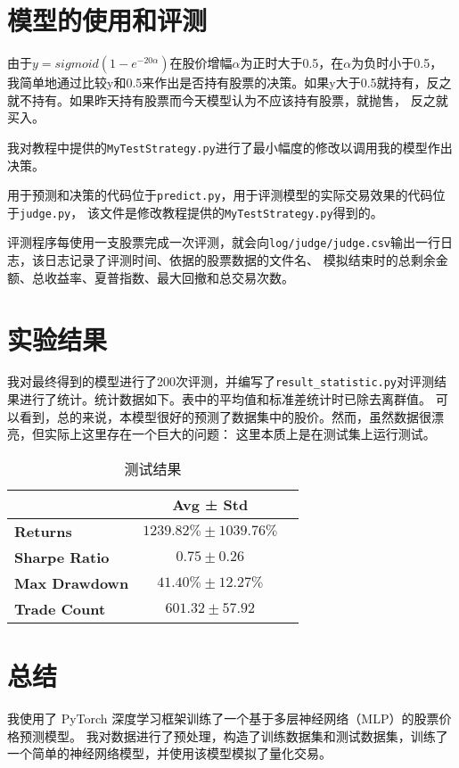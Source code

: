 \documentclass[final,5p,times,twocolumn,authoryear]{elsarticle}
\begin{document}
\section{模型的使用和评测}
由于\(y = sigmoid(1 - e^{-20\alpha})\)在股价增幅\(\alpha\)为正时大于0.5，在\(\alpha\)为负时小于0.5，
我简单地通过比较y和0.5来作出是否持有股票的决策。如果y大于0.5就持有，反之就不持有。如果昨天持有股票而今天模型认为不应该持有股票，就抛售，
反之就买入。

我对教程中提供的\texttt{MyTestStrategy.py}进行了最小幅度的修改以调用我的模型作出决策。

用于预测和决策的代码位于\texttt{predict.py}，用于评测模型的实际交易效果的代码位于\texttt{judge.py}，
该文件是修改教程提供的\texttt{MyTestStrategy.py}得到的。

评测程序每使用一支股票完成一次评测，就会向\texttt{log/judge/judge.csv}输出一行日志，该日志记录了评测时间、依据的股票数据的文件名、
模拟结束时的总剩余金额、总收益率、夏普指数、最大回撤和总交易次数。

\section{实验结果}
我对最终得到的模型进行了200次评测，并编写了\texttt{result\_statistic.py}对评测结果进行了统计。统计数据如下。表中的平均值和标准差统计时已除去离群值。
可以看到，总的来说，本模型很好的预测了数据集中的股价。然而，虽然数据很漂亮，但实际上这里存在一个巨大的问题：
这里本质上是在测试集上运行测试。
\begin{table}[h!]
       \centering
       \begin{tabular}{@{}lcc@{}}
              \toprule
              \textbf{}             & \textbf{Avg ± Std}        \\ \midrule
              \textbf{Returns}      & $1239.82\% \pm 1039.76\%$ \\
              \textbf{Sharpe Ratio} & $0.75 \pm 0.26$           \\
              \textbf{Max Drawdown} & $41.40\%\pm 12.27\%$      \\
              \textbf{Trade Count}  & $601.32 \pm 57.92$        \\ \midrule
       \end{tabular}
       \caption{测试结果}
       \label{tab:performance}
\end{table}

\section{总结}
我使用了 PyTorch 深度学习框架训练了一个基于多层神经网络（MLP）的股票价格预测模型。
我对数据进行了预处理，构造了训练数据集和测试数据集，训练了一个简单的神经网络模型，并使用该模型模拟了量化交易。
\end{document}

